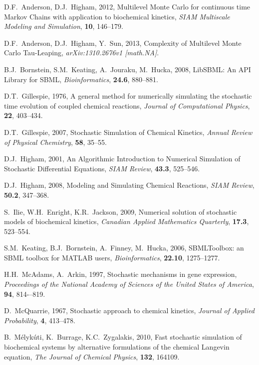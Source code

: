 \documentclass[ugrad,lot,lof,openright,11pt,oneside,onehalfspace]{RUthesis}
\begin{document}

\begin{thebibliography}{99}

	D.F.~Anderson, D.J.~Higham, 2012, Multilevel Monte Carlo for continuous time Markov Chains with application to biochemical kinetics, {\it SIAM Multiscale Modeling and Simulation}, {\bf 10}, 146--179.

	D.F.~Anderson, D.J.~Higham, Y.~Sun, 2013, Complexity of Multilevel Monte Carlo Tau-Leaping, {\it arXiv:1310.2676v1 [math.NA]}.

	B.J.~Bornstein, S.M.~Keating, A.~Jouraku, M.~Hucka, 2008, LibSBML: An API Library for SBML, {\it Bioinformatics}, {\bf 24.6}, 880--881.

	D.T.~Gillespie, 1976, A general method for numerically simulating the stochastic time evolution of coupled chemical reactions, {\it Journal of Computational Physics}, {\bf 22}, 403--434.

	D.T.~Gillespie, 2007, Stochastic Simulation of Chemical Kinetics, {\it Annual Review of Physical Chemistry}, {\bf 58}, 35--55.

	D.J.~Higham, 2001, An Algorithmic Introduction to Numerical Simulation of Stochastic Differential Equations, {\it SIAM Review}, {\bf 43.3}, 525--546.

	D.J.~Higham, 2008, Modeling and Simulating Chemical Reactions, {\it SIAM Review}, {\bf 50.2}, 347--368.

	S.~Ilie, W.H.~Enright, K.R.~Jackson, 2009, Numerical solution of stochastic models of biochemical kinetics, {\it Canadian Applied Mathematics Quarterly}, {\bf 17.3}, 523--554.

	S.M.~Keating, B.J.~Bornstein, A.~Finney, M.~Hucka, 2006, SBMLToolbox: an SBML toolbox for MATLAB users, {\it Bioinformatics}, {\bf 22.10}, 1275--1277.

	H.H.~McAdams, A.~Arkin, 1997, Stochastic mechanisms in gene expression, {\it Proceedings of the National Academy of Sciences of the United States of America}, {\bf 94}, 814-–819.

	D.~McQuarrie, 1967, Stochastic approach to chemical kinetics, {\it Journal of Applied Probability}, {\bf 4}, 413--478.

	B.~M\'{e}lyk\'{u}ti, K.~Burrage, K.C.~Zygalakis, 2010, Fast stochastic simulation of biochemical systems by alternative formulations of the chemical Langevin equation, {\it The Journal of Chemical Physics}, {\bf 132}, 164109.


\end{thebibliography}
\end{document}
